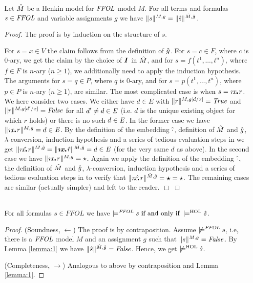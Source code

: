 \begin{lemma}\label{lemma:1} \sloppy
  Let $\hat{M}$ be a Henkin model for $\mathit{FFOL}$ model $M$. For all
  terms and formulas $s\in \mathit{FFOL}$ and variable assignments $g$ we have $\| s
  \|^{M,g} = \| \hat{s} \|^{\hat{M}, \hat{g}}$.


\begin{proof} 
  The proof is by induction on the structure of $s$.

  For $s=x\in V$ the claim follows from the definition of
  $\hat{g}$. For $s=c\in F$, where $c$ is $0$-ary, we get the claim by
  the choice of $\boldsymbol{I}$ in $\hat{M}$, and for $s=f(t^1,\ldots,t^n)$,
  where $f\in F$ is $n$-ary ($n\geq 1$), we additionally need to apply
  the induction hypothesis. The arguments for $s=q\in P$, where $q$ is
  $0$-ary, and for $s=p(t^1,\ldots,t^n)$, where $p\in P$ is $n$-ary
  ($n\geq 1$), are similar.  The most complicated case is when
  $s=\Descr x\lambdot r$. We here consider two cases. We either have
  $d \in E$ with
  $\| r \|^{M,g[d/x]} = \mathit{True}$ and $\| r \|^{M,g[d'/x]} = \mathit{False}$ for
  all $d'\not=d\in \mathit{E}$ (i.e. $d$ is the unique existing object for
  which $r$ holds) or there is no such $d\in \mathit{E}$. In the former case
  we have $\| \Descr x\lambdot r \|^{M,g} = d \in \ex$. By the
  definition of the embedding $\hat{\cdot}$, definition of $\hat{M}$ and
  $\hat{g}$, $\lambda$-conversion, induction hypothesis and a series of tedious evaluation
  steps in \HOL we get
  $\| \map{\Descr x\lambdot r} \|^{\map M, \map g} = \| \hol{\Descr
    x\lambdot} \map{r} \|^{\map M, \map g} = d \in \ex$
  (for the very same $d$ as above). In the second case we have
  $\| \Descr x\lambdot r \|^{M,g} = \star$. Again we apply the
  definition of the embedding $\hat{\cdot}$, the definition of $\hat{M}$
  and $\hat{g}$, $\lambda$-conversion, induction hypothesis and a series of tedious
  evaluation steps in \HOL to verify that
  $\| \map{\Descr x\lambdot r} \|^{\map M, \map g} = \hol{\star} =
  \star$. The remaining cases are similar (actually simpler) and left
  to the reader. $\Box$
\end{proof}
\end{lemma}


\begin{theorem}\ \\
For all formulas $s\in FFOL$ we have
 $\models^{\mathit{FFOL}} s \text{ if and only if }  \models^{\text{\textrm{HOL}}} \hat{s}$.


 \begin{proof} 
 (Soundness, $\leftarrow$) The proof is by
   contraposition. Assume $\not\models^{\mathit{FFOL}} s$, i.e, there is a
   $\mathit{FFOL}$ model $M$ and an assignment $g$ such that
   $\|s\|^{M,g}=\mathit{False}$. By Lemma \ref{lemma:1} we have $\| \hat{s}
   \|^{\hat{M}, \hat{g}}=\mathit{False}$. Hence, we get $\not\models^{\text{\textrm{HOL}}} \hat{s}$.

 (Completeness, $\rightarrow$) Analogous to above by contraposition
 and Lemma \ref{lemma:1}.
\end{proof}
\end{theorem} 

